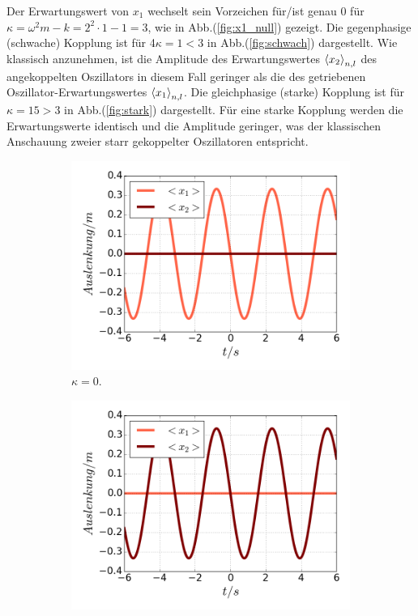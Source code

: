     Der Erwartungswert von $x_1$ wechselt sein Vorzeichen für/ist genau 0 für $\kappa=\omega^2m-k = 2^2\cdot1-1=3$, wie in Abb.(\ref{fig:x1_null}) gezeigt.
    Die gegenphasige (schwache) Kopplung ist für 4$\kappa=1<3$ in Abb.(\ref{fig:schwach}) dargestellt. Wie klassisch anzunehmen, ist die Amplitude des Erwartungswertes $\braket{x_2}_{n,l}$ des angekoppelten Oszillators in diesem Fall geringer als die des getriebenen Oszillator-Erwartungswertes $\braket{x_1}_{n,l}$.
    Die gleichphasige (starke) Kopplung ist für $\kappa=15>3$ in Abb.(\ref{fig:stark}) dargestellt.
    Für eine starke Kopplung werden die Erwartungswerte identisch und die Amplitude geringer, was der klassischen Anschauung zweier starr gekoppelter Oszillatoren entspricht.
\iffalse
    \begin{figure}
      \begin{subfigure}[t]{0.5\textwidth}
        \centering
        \includegraphics[width=\textwidth]{plots/<x2>nl0.png}
        \caption{$\kappa=0$.}
        \label{fig:x2_null}
      \end{subfigure}
      \begin{subfigure}[t]{0.5\textwidth}
          \centering
          \includegraphics[width=\textwidth]{plots/<x1>nl0.png}

\end{subfigure}
\end{figure}
